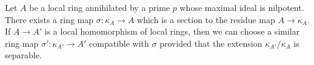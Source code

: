 \begin{lemma}
\label{lemma-cohen}
Let $A$ be a local ring annihilated by a prime $p$ whose maximal ideal is
nilpotent. There exists a ring map $\sigma : \kappa_A \to A$
which is a section to the residue map $A \to \kappa_A$. If $A \to A'$ is
a local homomorphism of local rings, then we can choose a similar
ring map $\sigma' : \kappa_{A'} \to A'$ compatible with $\sigma$ provided
that the extension $\kappa_{A'}/\kappa_A$ is separable.
\end{lemma}